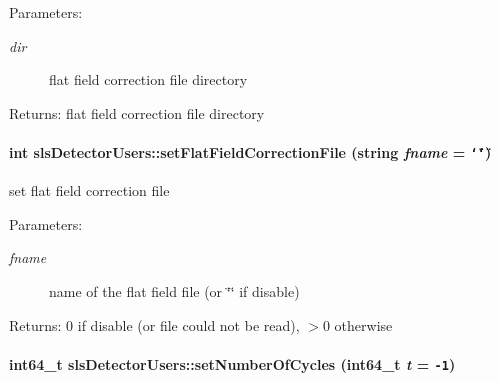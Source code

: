 \begin{Desc}
\item[Parameters:]
\begin{description}
\item[{\em dir}]flat field correction file directory \end{description}
\end{Desc}
\begin{Desc}
\item[Returns:]flat field correction file directory \end{Desc}
\hypertarget{classslsDetectorUsers_ad9e6da8683ba2887174505fd3b7d739}{
\paragraph[setFlatFieldCorrectionFile]{\setlength{\rightskip}{0pt plus 5cm}int sls\-Detector\-Users::set\-Flat\-Field\-Correction\-File (string {\em fname} = {\tt \char`\"{}\char`\"{}})}\hfill}
\label{classslsDetectorUsers_ad9e6da8683ba2887174505fd3b7d739}


set flat field correction file 

\begin{Desc}
\item[Parameters:]
\begin{description}
\item[{\em fname}]name of the flat field file (or \char`\"{}\char`\"{} if disable) \end{description}
\end{Desc}
\begin{Desc}
\item[Returns:]0 if disable (or file could not be read), $>$0 otherwise \end{Desc}
\hypertarget{classslsDetectorUsers_8b741851c4eaef4e29322c99fd17cb3b}{
\paragraph[setNumberOfCycles]{\setlength{\rightskip}{0pt plus 5cm}int64\_\-t sls\-Detector\-Users::set\-Number\-Of\-Cycles (int64\_\-t {\em t} = {\tt -1})}\hfill}
\label{classslsDetectorUsers_8b741851c4eaef4e29322c99fd17cb3b}


